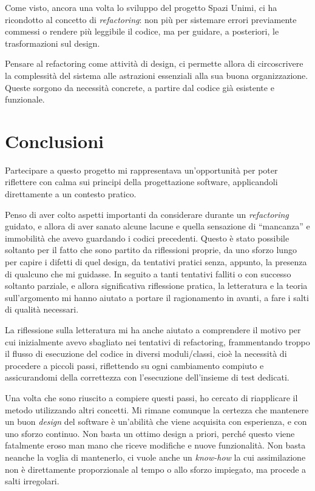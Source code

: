 \documentclass[12pt]{report}
\begin{document}
Come visto, ancora una volta lo sviluppo del progetto Spazi Unimi,
ci ha ricondotto al concetto di \textit{refactoring}: non più per sistemare
errori previamente commessi o rendere più leggibile il codice, 
ma per guidare, a posteriori, le trasformazioni sul design. 

Pensare al refactoring come attività di design, 
ci permette allora di circoscrivere la complessità del sistema alle 
astrazioni essenziali alla sua buona organizzazione. Queste sorgono 
da necessità concrete, a partire dal codice già esistente e funzionale.


\chapter{Conclusioni}

Partecipare a questo progetto mi rappresentava un'opportunità per poter
riflettere con calma sui principi della progettazione software, applicandoli
direttamente a un contesto pratico. 


Penso di aver colto aspetti importanti da considerare durante un 
\textit{refactoring} guidato, e allora di aver sanato alcune lacune e 
quella sensazione di ``mancanza'' e immobilità che avevo guardando i codici 
precedenti. Questo è stato possibile soltanto per il fatto che sono 
partito da riflessioni proprie, da uno sforzo lungo per capire i 
difetti di quel design, da tentativi pratici senza, appunto, 
la presenza di qualcuno che mi guidasse. In seguito a tanti tentativi
falliti o con successo soltanto parziale, e allora significativa riflessione
pratica, la letteratura e la teoria sull'argomento mi hanno aiutato a 
portare il ragionamento in avanti, a fare i salti di qualità
necessari.

La riflessione sulla letteratura mi ha anche aiutato a comprendere il 
motivo per cui inizialmente avevo sbagliato nei tentativi di refactoring,
frammentando troppo il flusso di esecuzione del codice 
in diversi moduli/classi, cioè la necessità
di procedere a piccoli passi, riflettendo su ogni
cambiamento compiuto e assicurandomi della correttezza con
l'esecuzione dell'insieme di test dedicati. 

Una volta che sono riuscito a compiere questi passi, ho cercato di riapplicare
il metodo utilizzando altri concetti. Mi rimane comunque la certezza che
mantenere un buon \textit{design} del software è un'abilità che viene acquisita
con esperienza, e con uno sforzo continuo. Non basta un ottimo design a
priori, perché questo viene fatalmente eroso man mano che riceve modifiche
e nuove funzionalità. Non basta neanche la voglia di mantenerlo, ci vuole
anche un \textit{know-how} la cui assimilazione non è direttamente 
proporzionale al tempo o allo sforzo impiegato, ma procede a salti irregolari.
\end{document}
